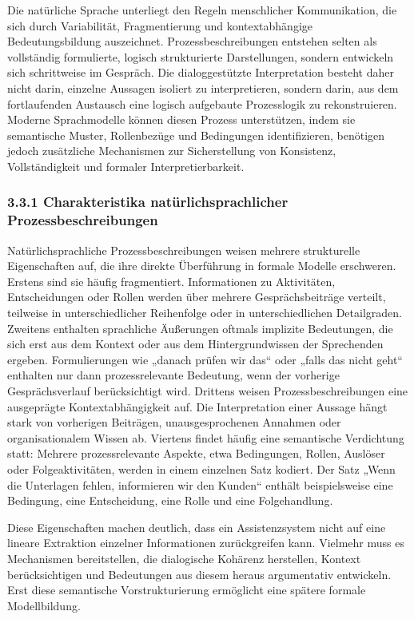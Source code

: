 \documentclass[a4paper,12pt]{scrreprt}
\begin{document}
Die natürliche Sprache unterliegt den Regeln menschlicher Kommunikation, die sich durch Variabilität, Fragmentierung und kontextabhängige Bedeutungsbildung auszeichnet. Prozessbeschreibungen entstehen selten als vollständig formulierte, logisch strukturierte Darstellungen, sondern entwickeln sich schrittweise im Gespräch. Die dialoggestützte Interpretation besteht daher nicht darin, einzelne Aussagen isoliert zu interpretieren, sondern darin, aus dem fortlaufenden Austausch eine logisch aufgebaute Prozesslogik zu rekonstruieren. Moderne Sprachmodelle können diesen Prozess unterstützen, indem sie semantische Muster, Rollenbezüge und Bedingungen identifizieren, benötigen jedoch zusätzliche Mechanismen zur Sicherstellung von Konsistenz, Vollständigkeit und formaler Interpretierbarkeit.


\subsubsection*{3.3.1 Charakteristika natürlichsprachlicher Prozessbeschreibungen}

Natürlichsprachliche Prozessbeschreibungen weisen mehrere strukturelle Eigenschaften auf, die ihre direkte Überführung in formale Modelle erschweren. Erstens sind sie häufig fragmentiert. Informationen zu Aktivitäten, Entscheidungen oder Rollen werden über mehrere Gesprächsbeiträge verteilt, teilweise in unterschiedlicher Reihenfolge oder in unterschiedlichen Detailgraden. 
Zweitens enthalten sprachliche Äußerungen oftmals implizite Bedeutungen, die sich erst aus dem Kontext oder aus dem Hintergrundwissen der Sprechenden ergeben. Formulierungen wie „danach prüfen wir das“ oder „falls das nicht geht“ enthalten nur dann prozessrelevante Bedeutung, wenn der vorherige Gesprächsverlauf berücksichtigt wird.
Drittens weisen Prozessbeschreibungen eine ausgeprägte Kontextabhängigkeit auf. Die Interpretation einer Aussage hängt stark von vorherigen Beiträgen, unausgesprochenen Annahmen oder organisationalem Wissen ab. 
Viertens findet häufig eine semantische Verdichtung statt:
Mehrere prozessrelevante Aspekte, etwa Bedingungen, Rollen, Auslöser oder Folgeaktivitäten, werden in einem einzelnen Satz kodiert. Der Satz „Wenn die Unterlagen fehlen, informieren wir den Kunden“ enthält beispielsweise eine Bedingung, eine Entscheidung, eine Rolle und eine Folgehandlung.

Diese Eigenschaften machen deutlich, dass ein Assistenzsystem nicht auf eine lineare Extraktion einzelner Informationen zurückgreifen kann. Vielmehr muss es Mechanismen bereitstellen, die dialogische Kohärenz herstellen, Kontext berücksichtigen und Bedeutungen aus diesem heraus argumentativ entwickeln. Erst diese semantische Vorstrukturierung ermöglicht eine spätere formale Modellbildung.
\end{document}
